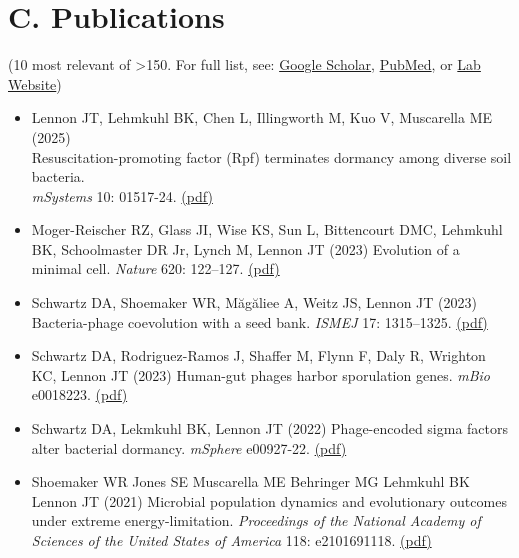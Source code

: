 \documentclass[11pt]{article}  %
\begin{document}
\section*{C. Publications}
(10 most relevant of >150. For full list, see: \href{https://scholar.google.com/citations?hl=en&user=d-hWatsAAAAJ}{Google Scholar}, \href{https://www.ncbi.nlm.nih.gov/myncbi/jay.lennon.1/bibliography/public/}{PubMed}, or \href{https://www.ncbi.nlm.nih.gov/myncbi/jay.lennon.1/bibliography/public/}{Lab Website})

\vspace{-0.05em}

\begin{itemize}[leftmargin=*, label={}, itemsep=1em]

\item Lennon JT, Lehmkuhl BK, Chen L, Illingworth M, Kuo V, Muscarella ME (2025) \\Resuscitation-promoting factor (Rpf) terminates dormancy among diverse soil bacteria.\\
\textit{mSystems} 10: 01517-24. \href{https://lennonlab.github.io/assets/publications/Lennon_etal_2025b.pdf}{(pdf)}

\item Moger-Reischer RZ, Glass JI, Wise KS, Sun L, Bittencourt DMC, Lehmkuhl BK, Schoolmaster DR Jr, Lynch M, Lennon JT (2023) Evolution of a minimal cell. \textit{Nature} 620: 122--127. \href{https://lennonlab.github.io/assets/publications/Moger-Reischer_etal_2023.pdf}{(pdf)}

\item Schwartz DA, Shoemaker WR, Măgăliee A, Weitz JS, Lennon JT (2023) Bacteria-phage coevolution with a seed bank. \textit{ISMEJ} 17: 1315–1325. \href{https://lennonlab.github.io/assets/publications/Schwartz_etal_2023b.pdf}{(pdf)}

\item Schwartz DA, Rodriguez-Ramos J, Shaffer M, Flynn F, Daly R, Wrighton KC, Lennon JT (2023) Human-gut phages harbor sporulation genes. \textit{mBio} e0018223. \href{https://lennonlab.github.io/assets/publications/Schwartz_etal_2023a.pdf}{(pdf)}

\item Schwartz DA, Lekmkuhl BK, Lennon JT (2022) Phage-encoded sigma factors alter bacterial dormancy. \textit{mSphere} e00927-22. \href{https://lennonlab.github.io/assets/publications/Schwartz_etal_2022.pdf}{(pdf)}

\item Shoemaker WR Jones SE Muscarella ME Behringer MG Lehmkuhl BK Lennon JT (2021) Microbial population dynamics and evolutionary outcomes under extreme energy-limitation. \textit{Proceedings of the National Academy of Sciences of the United States of America} 118: e2101691118. \href{https://lennonlab.github.io/assets/publications/Shoemaker_etal_2021b.pdf}{(pdf)}


\end{itemize}
\end{document}

